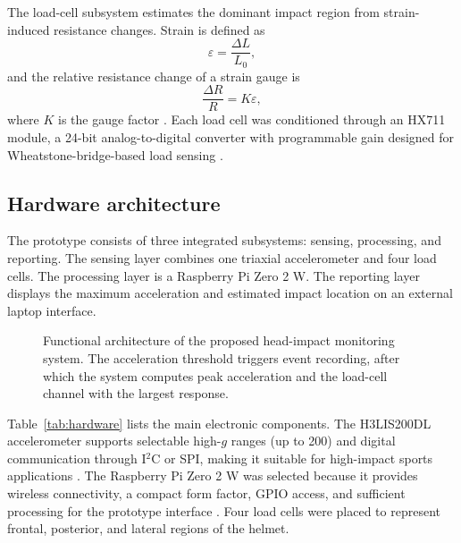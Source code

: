 \documentclass[11pt]{article}
\begin{document}
The load-cell subsystem estimates the dominant impact region from strain-induced resistance changes. Strain is defined as
\begin{equation}
\varepsilon = \frac{\Delta L}{L_0},
\end{equation}
and the relative resistance change of a strain gauge is
\begin{equation}
\frac{\Delta R}{R} = K\varepsilon,
\end{equation}
where $K$ is the gauge factor \citep{rodriguez2016galgas}. Each load cell was conditioned through an HX711 module, a 24-bit analog-to-digital converter with programmable gain designed for Wheatstone-bridge-based load sensing \citep{hx711datasheet}.

\subsection{Hardware architecture}
The prototype consists of three integrated subsystems: sensing, processing, and reporting. The sensing layer combines one triaxial accelerometer and four load cells. The processing layer is a Raspberry Pi Zero 2 W. The reporting layer displays the maximum acceleration and estimated impact location on an external laptop interface.

\begin{figure}[htbp]
\centering
{}
\caption{Functional architecture of the proposed head-impact monitoring system. The acceleration threshold triggers event recording, after which the system computes peak acceleration and the load-cell channel with the largest response.}
\label{fig:architecture}
\end{figure}

Table~\ref{tab:hardware} lists the main electronic components. The H3LIS200DL accelerometer supports selectable high-$g$ ranges (up to \SI{200}{\gee}) and digital communication through I$^2$C or SPI, making it suitable for high-impact sports applications \citep{dfrobot_h3lis200dl}. The Raspberry Pi Zero 2 W was selected because it provides wireless connectivity, a compact form factor, GPIO access, and sufficient processing for the prototype interface \citep{raspberrypi_zero2w}. Four load cells were placed to represent frontal, posterior, and lateral regions of the helmet.
\end{document}
